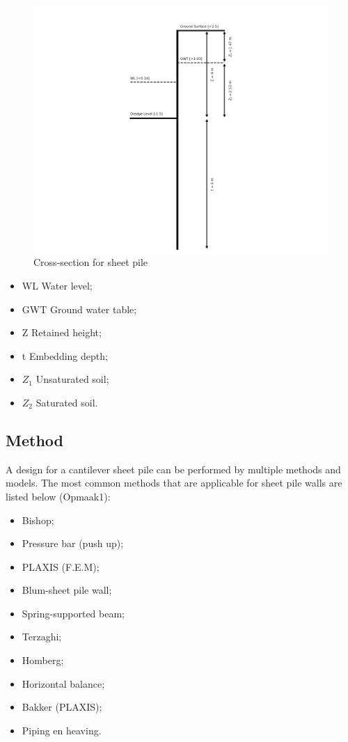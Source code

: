 
\begin{figure}[H]
    \centering
    \includegraphics[width=0.90\linewidth]{figures/ch8/cross_section.png}
    \caption{Cross-section for sheet pile}
    \label{fig:problem_description_sheetpiles}
\end{figure}

\begin{itemize}
    \item WL Water level;
    \item GWT Ground water table;
    \item Z Retained height;
    \item t Embedding depth;
    \item $Z_{1}$ Unsaturated soil;
    \item $Z_{2}$ Saturated soil.
\end{itemize}

\subsection{Method}

A design for a cantilever sheet pile can be performed by multiple methods and models. The most common methods that are applicable for sheet pile walls are listed below (Opmaak1):

\begin{itemize}
  \item Bishop;
  \item Pressure bar (push up);
  \item PLAXIS (F.E.M);
  \item Blum-sheet pile wall;
  \item Spring-supported beam;
  \item Terzaghi;
  \item Homberg;
  \item Horizontal balance;
  \item Bakker (PLAXIS);
  \item Piping en heaving.
\end{itemize}

